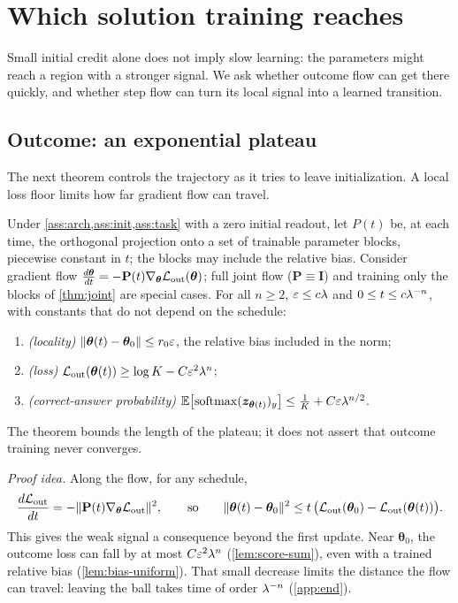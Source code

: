 \section{Which solution training reaches}
\label{sec:reach}

Small initial credit alone does not imply slow learning: the parameters might reach a region with a stronger signal. We ask
whether outcome flow can get there quickly, and whether step flow can turn its local signal into a learned transition.

\subsection{Outcome: an exponential plateau}

The next theorem controls the trajectory as it tries to leave initialization. A local loss floor limits how far gradient flow can travel.

\begin{theorem}
\label{thm:outcome-end}
Under \cref{ass:arch,ass:init,ass:task} with a zero initial readout, let $P(t)$ be, at each time, the orthogonal projection onto a set
of trainable parameter blocks, piecewise constant in $t$; the blocks may include the relative bias. Consider gradient flow
$\tfrac{d\bm\theta}{dt}=-\mathbf P(t)\nabla_{\bm\theta}\Lout(\bm\theta)$; full joint flow ($\mathbf P\equiv\mathbf I$) and training only the blocks of \cref{thm:joint} are special cases.
For all $n\ge2$, $\varepsilon\le c\lambda$ and $0\le t\le c\lambda^{-n}$, with constants that do not depend on the schedule:
\begin{enumerate}[label=(\roman*),leftmargin=*,itemsep=0pt,topsep=2pt]
\item \emph{(locality)} $\|\bm\theta(t)-\bm\theta_0\|\le r_0\varepsilon$, the relative bias included in the norm;
\item \emph{(loss)} $\mathcal L_{\mathrm{out}}(\bm\theta(t))\ge\log K-C\varepsilon^2\lambda^n$;
\item \emph{(correct-answer probability)} $\mathbb E\bigl[\operatorname{softmax}(\bm z_{\bm\theta(t)})_y\bigr]\le\frac{1}{K}+C\varepsilon\lambda^{n/2}$.
\end{enumerate}
\end{theorem}
The theorem bounds the length of the plateau; it does not assert that outcome training never converges.

\emph{Proof idea.} Along the flow, for any schedule,
\[
 \frac{d\mathcal L_{\mathrm{out}}}{dt}=-\|\mathbf P(t)\nabla_{\bm\theta}\mathcal L_{\mathrm{out}}\|^2,
 \qquad\text{so}\qquad
 \|\bm\theta(t)-\bm\theta_0\|^2\le t\,\bigl(\mathcal L_{\mathrm{out}}(\bm\theta_0)-\mathcal L_{\mathrm{out}}(\bm\theta(t))\bigr).
\]
This gives the weak signal a consequence beyond the first update. Near $\bm\theta_0$, the outcome loss can fall by at most
$C\varepsilon^2\lambda^n$ (\cref{lem:score-sum}), even with a trained relative bias (\cref{lem:bias-uniform}). That small decrease limits
the distance the flow can travel: leaving the ball takes time of order $\lambda^{-n}$ (\cref{app:end}).

